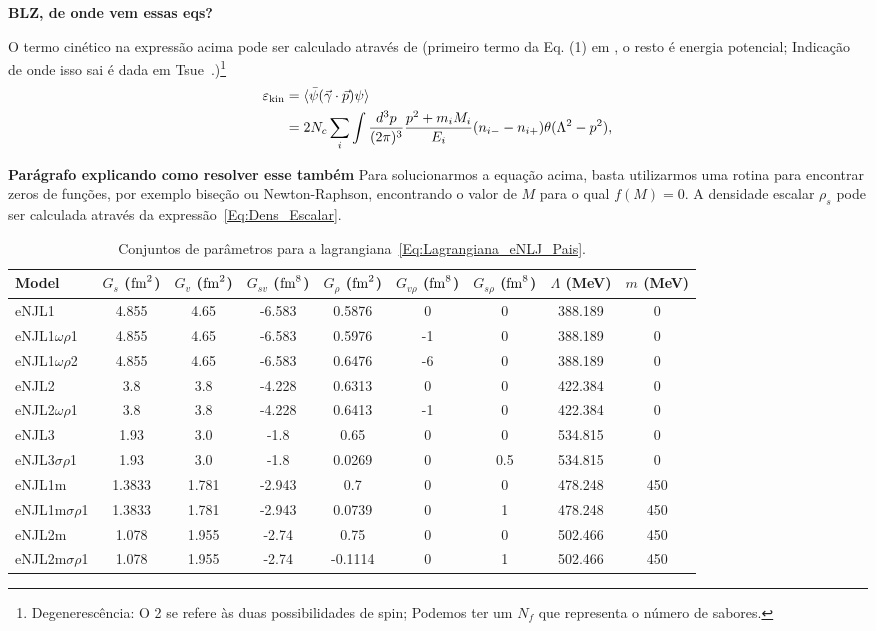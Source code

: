 \documentclass[prc, reprint, amsmath, linenumbers,10pt]{revtex4-1}
\begin{document}
\textbf{BLZ, de onde vem essas eqs?}

O termo cinético na expressão acima pode ser calculado através de (primeiro termo da Eq. (1) em \cite{Menezes2003}, o resto é energia potencial; Indicação de onde isso sai é dada em Tsue~\cite{Lee2013}.)\footnote{Degenerescência: O 2 se refere às duas possibilidades de spin; Podemos ter um $N_f$ que representa o número de sabores.}
\begin{align}
	\varepsilon_{\rm{kin}} &= \langle\bar{\psi}(\vec{\gamma}\cdot\vec{p})\psi\rangle \\
	&= 2 N_c\sum_i \int \frac{d^3p}{(2\pi)^3}\frac{p^2 + m_i M_i}{E_i}(n_{i-}-n_{i+})\theta(\Lambda^2 - p^2),
\end{align}

\textbf{Parágrafo explicando como resolver esse também}
Para solucionarmos a equação acima, basta utilizarmos uma rotina para encontrar zeros de funções, por exemplo biseção ou Newton-Raphson, encontrando o valor de $M$ para o qual $f(M) = 0$. A densidade escalar $\rho_s$ pode ser calculada através da expressão~\eqref{Eq:Dens_Escalar}.


\begin{table*}
\caption{Conjuntos de parâmetros para a lagrangiana~\eqref{Eq:Lagrangiana_eNLJ_Pais}\cite{Pais2016}. \label{Tab:Parametros_eNJL}}
\begin{ruledtabular}
\begin{tabular}{lcccccccc}
Model & $G_s$ ($\rm{fm}^2$) & $G_v$ ($\rm{fm}^2$) & $G_{sv}$ ($\rm{fm}^8$) & $G_\rho$ ($\rm{fm}^2$) & $G_{v\rho}$ ($\rm{fm}^8$) & $G_{s\rho}$ ($\rm{fm}^8$) & $\Lambda$ (MeV) & $m$ (MeV) \\
\hline
eNJL1 & 4.855 & 4.65 & -6.583 & 0.5876 & 0 & 0 & 388.189 & 0 \\
eNJL1$\omega\rho$1 & 4.855 & 4.65 & -6.583 & 0.5976 & -1 & 0 & 388.189 & 0 \\
eNJL1$\omega\rho$2 & 4.855 & 4.65 & -6.583 & 0.6476 & -6 & 0 & 388.189 & 0 \\
eNJL2 & 3.8 & 3.8 & -4.228 & 0.6313 & 0 & 0 & 422.384 & 0 \\
eNJL2$\omega\rho$1 & 3.8 & 3.8 & -4.228 & 0.6413 & -1 & 0 & 422.384 & 0 \\
eNJL3 & 1.93 & 3.0 & -1.8 & 0.65 & 0 & 0 & 534.815 & 0 \\
eNJL3$\sigma\rho$1 & 1.93 & 3.0 & -1.8 & 0.0269 & 0 & 0.5 & 534.815 & 0 \\
eNJL1m & 1.3833 & 1.781 & -2.943 & 0.7 & 0 & 0 & 478.248 & 450 \\
eNJL1m$\sigma\rho$1 & 1.3833 & 1.781 & -2.943 & 0.0739 & 0 & 1 & 478.248 & 450 \\
eNJL2m & 1.078 & 1.955 & -2.74 & 0.75 & 0 & 0 & 502.466 & 450 \\
eNJL2m$\sigma\rho$1 & 1.078 & 1.955 & -2.74 & -0.1114 & 0 & 1 & 502.466 & 450 \\
\end{tabular}
\end{ruledtabular}
\end{table*}
\end{document}
